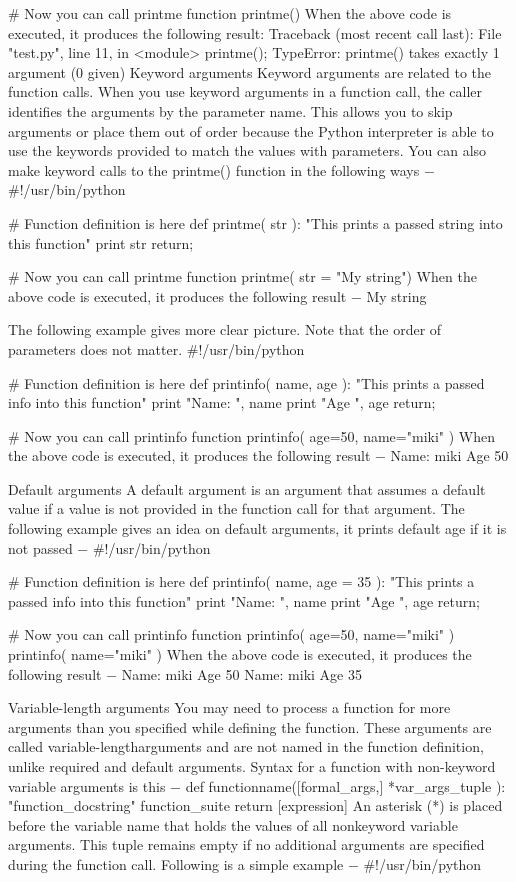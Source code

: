 	# Now you can call printme function
	printme()
When the above code is executed, it produces the following result:
	Traceback (most recent call last):
	  File "test.py", line 11, in <module>
	    printme();
	TypeError: printme() takes exactly 1 argument (0 given)
Keyword arguments
Keyword arguments are related to the function calls. When you use keyword arguments in a function call, the caller identifies the arguments by the parameter name.
This allows you to skip arguments or place them out of order because the Python interpreter is able to use the keywords provided to match the values with parameters. You can also make keyword calls to the printme() function in the following ways −
	#!/usr/bin/python

	# Function definition is here
	def printme( str ):
	   "This prints a passed string into this function"
	   print str
	   return;

	# Now you can call printme function
	printme( str = "My string")
When the above code is executed, it produces the following result −
	My string

The following example gives more clear picture. Note that the order of parameters does not matter.
	#!/usr/bin/python

	# Function definition is here
	def printinfo( name, age ):
	   "This prints a passed info into this function"
	   print "Name: ", name
	   print "Age ", age
	   return;

	# Now you can call printinfo function
	printinfo( age=50, name="miki" )
When the above code is executed, it produces the following result −
	Name:  miki
	Age  50

Default arguments
A default argument is an argument that assumes a default value if a value is not provided in the function call for that argument. The following example gives an idea on default arguments, it prints default age if it is not passed −
	#!/usr/bin/python

	# Function definition is here
	def printinfo( name, age = 35 ):
	   "This prints a passed info into this function"
	   print "Name: ", name
	   print "Age ", age
	   return;

	# Now you can call printinfo function
	printinfo( age=50, name="miki" )
	printinfo( name="miki" )
When the above code is executed, it produces the following result −
	Name:  miki
	Age  50
	Name:  miki
	Age  35

Variable-length arguments
You may need to process a function for more arguments than you specified while defining the function. These arguments are called variable-lengtharguments and are not named in the function definition, unlike required and default arguments.
Syntax for a function with non-keyword variable arguments is this −
	def functionname([formal_args,] *var_args_tuple ):
	   "function_docstring"
	   function_suite
	   return [expression]
An asterisk (*) is placed before the variable name that holds the values of all nonkeyword variable arguments. This tuple remains empty if no additional arguments are specified during the function call. Following is a simple example −
	#!/usr/bin/python

